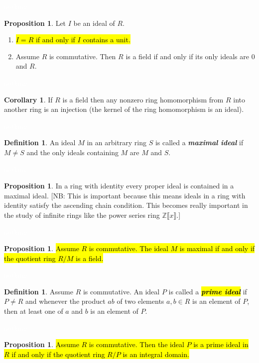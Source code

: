 \documentclass{article}
\theoremstyle{definition}
\newtheorem{prop}[thm]{Proposition}
\newtheorem{cor}[thm]{Corollary}
\newtheorem{defn}[thm]{Definition}
\newcommand{\nl}{\textcolor{white}{nothing}}
\newcommand{\lbb}{\llbracket}
\newcommand{\rbb}{\rrbracket}
\newcommand{\Z}{\mathbb{Z}}
\begin{document}
\nl

\begin{prop}
Let $I$ be an ideal of $R$.
\begin{enumerate}
\item \hl{$I = R$ if and only if $I$ contains a unit.}
\item Assume $R$ is commutative. Then $R$ is a field if and only if its only ideals are $0$ and $R$.
\end{enumerate}
\end{prop}

\nl

\begin{cor}
If $R$ is a field then any nonzero ring homomorphism from $R$ into another ring is an injection (the kernel of the ring homomorphism is an ideal).
\end{cor}

\nl

\begin{defn}
An ideal $M$ in an arbitrary ring $S$ is called a \textbf{\textit{maximal ideal}} if $M\neq S$ and the only ideals containing $M$ are $M$ and $S$.
\end{defn}

\nl

\begin{prop}
In a ring with identity every proper ideal is contained in a maximal ideal. [NB: This is important because this means ideals in a ring with identity satisfy the ascending chain condition. This becomes really important in the study of infinite rings like the power series ring $\Z\lbb x\rbb$.]
\end{prop}

\nl

\begin{prop}
\hl{Assume $R$ is commutative. The ideal $M$ is maximal if and only if the quotient ring $R/M$ is a field.}
\end{prop}

\nl

\begin{defn}
Assume $R$ is commutative. An ideal $P$ is called a \hl{\textit{\textbf{prime ideal}}} if $P\neq R$ and whenever the product $ab$ of two elements $a,b\in R$ is an element of $P$, then at least one of $a$ and $b$ is an element of $P$.
\end{defn}

\nl

\begin{prop}
\hl{Assume $R$ is commutative. Then the ideal $P$ is a prime ideal in $R$ if and only if the quotient ring $R/P$ is an integral domain.}
\end{prop}
\end{document}
